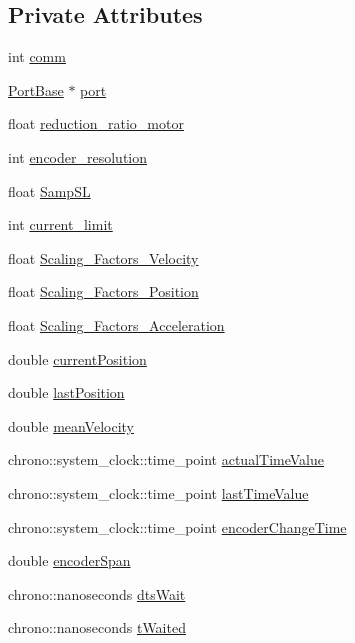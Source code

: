 \subsection*{Private Attributes}
\begin{DoxyCompactItemize}
\item 
int \hyperlink{classCiA402Device_a4e7a5a225fb27f5f02aeb0e6df38cd1f}{comm}
\item 
\hyperlink{classPortBase}{Port\+Base} $\ast$ \hyperlink{classCiA402Device_abc96eb117cc948d86e3bd4c07c7fe807}{port}
\item 
float \hyperlink{classCiA402Device_ad433f5fc62f2f7e78815807418ada3ba}{reduction\+\_\+ratio\+\_\+motor}
\item 
int \hyperlink{classCiA402Device_aab8a459615d73c60728344aaedc9f66c}{encoder\+\_\+resolution}
\item 
float \hyperlink{classCiA402Device_a5d0d4f4f4fcb7413e5de0270341fb209}{Samp\+SL}
\item 
int \hyperlink{classCiA402Device_a3dfe8b82f4049137b0992934a9239053}{current\+\_\+limit}
\item 
float \hyperlink{classCiA402Device_a57db6ccb730d3c26b7b33000d371b3bf}{Scaling\+\_\+\+Factors\+\_\+\+Velocity}
\item 
float \hyperlink{classCiA402Device_af6df63ddd2ddc1953f847855436ef129}{Scaling\+\_\+\+Factors\+\_\+\+Position}
\item 
float \hyperlink{classCiA402Device_a59de671e30be6f3f8f4c6ede7595d16c}{Scaling\+\_\+\+Factors\+\_\+\+Acceleration}
\item 
double \hyperlink{classCiA402Device_adb251ae496aeca707dcc51b43c64d0b8}{current\+Position}
\item 
double \hyperlink{classCiA402Device_a18ab540b52f7de30257f92340583a750}{last\+Position}
\item 
double \hyperlink{classCiA402Device_af926910c5a7e80c6ec198e1bd110b8d1}{mean\+Velocity}
\item 
chrono\+::system\+\_\+clock\+::time\+\_\+point \hyperlink{classCiA402Device_a2bd9cbd37d46453520e6fba51e720215}{actual\+Time\+Value}
\item 
chrono\+::system\+\_\+clock\+::time\+\_\+point \hyperlink{classCiA402Device_a3877e4a9b429edbac68503a828dd349d}{last\+Time\+Value}
\item 
chrono\+::system\+\_\+clock\+::time\+\_\+point \hyperlink{classCiA402Device_afb0d98f7068e7373f6d7b54d149f0680}{encoder\+Change\+Time}
\item 
double \hyperlink{classCiA402Device_a332cd74ce718607e9359b3db0f9ac402}{encoder\+Span}
\item 
chrono\+::nanoseconds \hyperlink{classCiA402Device_af3e9acfa1412aad23657a97464626f1d}{dts\+Wait}
\item 
chrono\+::nanoseconds \hyperlink{classCiA402Device_ad44fd620387924741772ab8e02d8b95a}{t\+Waited}
\end{DoxyCompactItemize}


